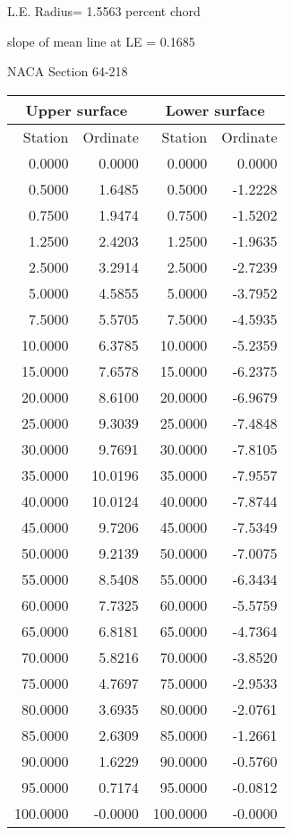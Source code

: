\documentclass[11pt]{book}
\begin{document}
L.E. Radius=  1.5563 percent chord


 slope of mean line at LE =  0.1685
 \newpage
  \label{s64-218}
 \begin{Large}
 NACA Section 64-218
 \end{Large}
  
 \vspace{8mm}
 \begin{tabular}{|r|r|r|r|} \hline 
 \multicolumn{2}{|c|}{Upper surface} & \multicolumn{2}{|c|}{Lower surface} \\
 \hline
 Station & Ordinate & Station & Ordinate \\
 \hline
0.0000 & 0.0000 & 0.0000 & 0.0000 \\
0.5000 & 1.6485 & 0.5000 & -1.2228 \\
0.7500 & 1.9474 & 0.7500 & -1.5202 \\
1.2500 & 2.4203 & 1.2500 & -1.9635 \\
2.5000 & 3.2914 & 2.5000 & -2.7239 \\
5.0000 & 4.5855 & 5.0000 & -3.7952 \\
7.5000 & 5.5705 & 7.5000 & -4.5935 \\
10.0000 & 6.3785 & 10.0000 & -5.2359 \\
15.0000 & 7.6578 & 15.0000 & -6.2375 \\
20.0000 & 8.6100 & 20.0000 & -6.9679 \\
25.0000 & 9.3039 & 25.0000 & -7.4848 \\
30.0000 & 9.7691 & 30.0000 & -7.8105 \\
35.0000 & 10.0196 & 35.0000 & -7.9557 \\
40.0000 & 10.0124 & 40.0000 & -7.8744 \\
45.0000 & 9.7206 & 45.0000 & -7.5349 \\
50.0000 & 9.2139 & 50.0000 & -7.0075 \\
55.0000 & 8.5408 & 55.0000 & -6.3434 \\
60.0000 & 7.7325 & 60.0000 & -5.5759 \\
65.0000 & 6.8181 & 65.0000 & -4.7364 \\
70.0000 & 5.8216 & 70.0000 & -3.8520 \\
75.0000 & 4.7697 & 75.0000 & -2.9533 \\
80.0000 & 3.6935 & 80.0000 & -2.0761 \\
85.0000 & 2.6309 & 85.0000 & -1.2661 \\
90.0000 & 1.6229 & 90.0000 & -0.5760 \\
95.0000 & 0.7174 & 95.0000 & -0.0812 \\
100.0000 & -0.0000 & 100.0000 & -0.0000 \\
 \hline 
 \end{tabular}
\end{document}
